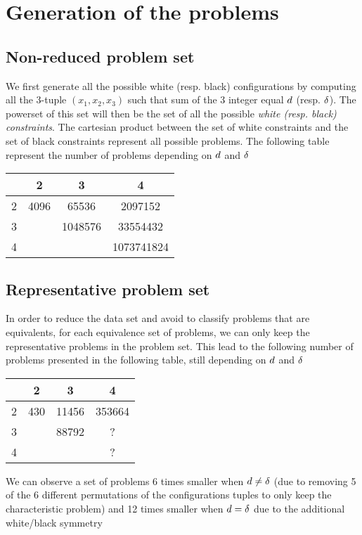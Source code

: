 \section{Generation of the problems}
\subsection{Non-reduced problem set}
We first generate all the possible white (resp. black) configurations by computing all the 3-tuple $(x_1,x_2, x_3)$ such that sum of the 3 integer equal $\wdd$ (resp. $\bdd$).
The powerset of this set will then be the set of all the possible \textit{white (resp. black) constraints}.
The cartesian product between the set of white constraints and the set of black constraints represent all possible problems. The following table represent the number of problems depending on $\wdd$ and $\bdd$
\begin{center}
\begin{tabular}{ | c | c | c | c |}
 \hline
 \diagbox{$\wdd$}{$\bdd$} & 2 & 3 & 4 \\ 
 \hline
 2 & 4096 & 65536 & 2097152\\
 \hline
 3 &  & 1048576 & 33554432\\
 \hline
 4 &  &  &  1073741824\\
\hline
\end{tabular}
\end{center}
\subsection{Representative problem set}
In order to reduce the data set and avoid to classify problems that are equivalents, for each equivalence set of problems, we can only keep the representative problems in the problem set. This lead to the following number of problems presented in the following table, still depending on $\wdd$ and $\bdd$
\begin{center}
\begin{tabular}{ | c | c | c | c |}
 \hline
 \diagbox{$\wdd$}{$\bdd$} & 2 & 3 & 4 \\ 
 \hline
 2 & 430 & 11456 & 353664\\
 \hline
 3 &  & 88792 & ?\\
 \hline
 4 &  &  &  ?\\
\hline
\end{tabular}
\end{center}

We can observe a set of problems 6 times smaller when $d \neq \delta$ (due to removing 5 of the 6 different permutations of the configurations tuples to only keep the characteristic problem) and 12 times smaller when $d=\delta$ due to the additional white/black symmetry

